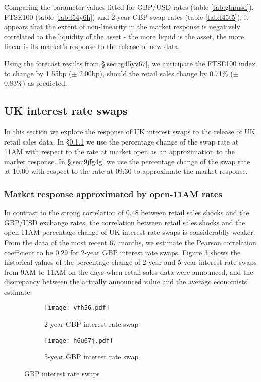 \documentclass[a4paper,11pt,pdftex,twoside,titlepage]{article}
\begin{document}
Comparing the parameter values fitted for GBP/USD rates (table
\ref{tab:gbpusd}), FTSE100 (table \ref{tab:f54y6h}) and 2-year GBP
swap rates (table \ref{tab:f45t5}), it appears that the extent of
non-linearity in the market response is negatively correlated to the
liquidity of the asset - the more liquid is the asset, the more linear
is its market's response to the release of new data.

Using the forecast results from \S\ref{sec:rg45yv67}, we anticipate
the FTSE100 index to change by 1.55bp ($\pm$ 2.00bp), should the
retail sales change by 0.71\% ($\pm$ 0.83\%) as predicted.

\subsection{UK interest rate swaps}
In this section we explore the response of UK interest swaps to the
release of UK retail sales data. In \S\ref{sec:9j44g} we use the
percentage change of the swap rate at 11AM with respect to the
rate at market open as an approximation to the market response. In
\S\ref{sec:9jfg4g} we use the percentage change of the swap rate at
10:00 with respect to the rate at 09:30 to approximate the market
response.


\subsubsection{Market response approximated by  open-11AM rates}
\label{sec:9j44g}
In contrast to the strong correlation of 0.48 between retail
sales shocks and the GBP/USD exchange rates, the correlation between
retail sales shocks and the open-11AM percentage change of UK
interest rate swaps is considerablly weaker. From the data of the most
recent 67 months, we estimate the Pearson correlation coefficient to
be 0.29 for 2-year GBP interest rate swaps. Figure \ref{fig:hb5rth5}
shows the historical values of the percentage change of 2-year and
5-year interest rate swaps from 9AM to 11AM on the days when retail
sales data were announced, and the discrepancy between the actually
announced value and the average economists' estimate.
\begin{figure}[htb!]
  \centering
  \begin{subfigure}[t]{0.15\textwidth}
    \texttt{[image: vfh56.pdf]}
    \caption{2-year GBP interest rate swap}
    \label{fig:vfh56}
  \end{subfigure}
  \begin{subfigure}[t]{0.85\textwidth}
    \texttt{[image: h6u67j.pdf]}
    \caption{5-year GBP interest rate swap}
    \label{fig:h6u67j}
  \end{subfigure}
  \caption{GBP interest rate swaps}
  \label{fig:hb5rth5}
\end{figure}
\end{document}
